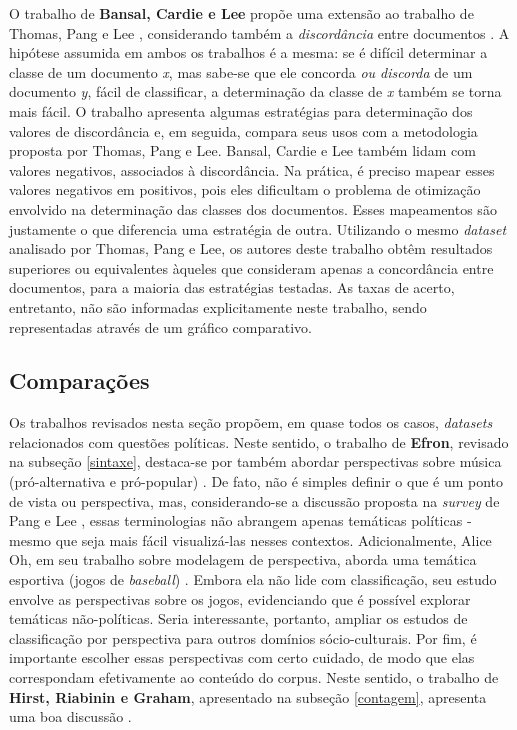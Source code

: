 O trabalho de \textbf{Bansal, Cardie e Lee} propõe uma extensão ao trabalho de Thomas, Pang e Lee \cite{get-out-the-vote}, considerando também a \emph{discordância} entre documentos \cite{disagree}. A hipótese assumida em ambos os trabalhos é a mesma: se é difícil determinar a classe de um documento \emph{x}, mas sabe-se que ele concorda \emph{ou discorda} de um documento \emph{y}, fácil de classificar, a determinação da classe de \emph{x} também se torna mais fácil. O trabalho apresenta algumas estratégias para determinação dos valores de discordância e, em seguida, compara seus usos com a metodologia proposta por Thomas, Pang e Lee. Bansal, Cardie e Lee também lidam com valores negativos, associados à discordância. Na prática, é preciso mapear esses valores negativos em positivos, pois eles dificultam o problema de otimização envolvido na determinação das classes dos documentos. Esses mapeamentos são justamente o que diferencia uma estratégia de outra. Utilizando o mesmo \emph{dataset} analisado por Thomas, Pang e Lee, os autores deste trabalho obtêm resultados superiores ou equivalentes àqueles que consideram apenas a concordância entre documentos, para a maioria das estratégias testadas. As taxas de acerto, entretanto, não são informadas explicitamente neste trabalho, sendo representadas através de um gráfico comparativo.



\subsection{Comparações}
\label{compara}

Os trabalhos revisados nesta seção propõem, em quase todos os casos, \emph{datasets} relacionados com questões políticas. Neste sentido, o trabalho de \textbf{Efron}, revisado na subseção \ref{sintaxe}, destaca-se por também abordar perspectivas sobre música (pró-alternativa e pró-popular) \cite{efron}. De fato, não é simples definir o que é um ponto de vista ou perspectiva, mas, considerando-se a discussão proposta na \emph{survey} de Pang e Lee \cite{omsa}, essas terminologias não abrangem apenas temáticas políticas - mesmo que seja mais fácil visualizá-las nesses contextos. Adicionalmente, Alice Oh, em seu trabalho sobre modelagem de perspectiva, aborda uma temática esportiva (jogos de \emph{baseball}) \cite{alice-oh}. Embora ela não lide com classificação, seu estudo envolve as perspectivas sobre os jogos, evidenciando que é possível explorar temáticas não-políticas. Seria interessante, portanto, ampliar os estudos de classificação por perspectiva para outros domínios sócio-culturais. Por fim, é importante escolher essas perspectivas com certo cuidado, de modo que elas correspondam efetivamente ao conteúdo do corpus. Neste sentido, o trabalho de \textbf{Hirst, Riabinin e Graham}, apresentado na subseção \ref{contagem}, apresenta uma boa discussão \cite{hirst-et-al}. 

